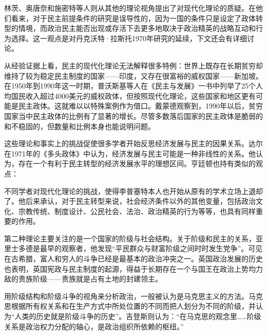 林茨、奥唐奈和施密特等人则从其他的理论视角提出了对现代化理论的质疑。在他们看来，对于民主前提条件的研究是误导性的，因为一国的条件只是设定了政体转型的情境，而政治民主能否出现或存活下去更多地取决于政治精英的战略互动和行为选择。这一观点是对丹克沃特·拉斯托1970年研究的延续，下文还会有详细讨论。

从经验证据上看，民主的现代化理论无法解释很多特例：世界上既存在长期贫穷却维持了较为稳定民主制度的国家——印度，又存在很富裕的威权国家——新加坡。在1950年到1990年这一时期，普沃斯基等人在《民主与发展》一书中列举了25个人均国民收入超过4000美元的威权政体，但按照现代化理论，这些国家和地区更有可能是民主政体。这就难以以特殊案例作为借口。戴蒙德观察到，1990年以后，贫穷国家当中民主政体的比例有了显著的增长。尽管多数落后国家的民主政体是脆弱的和不稳固的，但数量和比例本身也能说明问题。

这些理论和事实上的挑战促使很多学者开始反思经济发展与民主的因果关系。达尔在1971年的《多头政体》中认为，经济发展与民主可能是一种非线性的关系。他认为，存在一个有利于民主转型的经济发展水平的理想区间。亨廷顿也持有类似的观点：


不同学者对现代化理论的挑战，使得李普塞特本人也开始从原有的学术立场上退却了。他后来承认，对于民主转型来说，社会经济条件以外的其他变量，包括政治文化、宗教传统、制度设计、公民社会、法治、政治精英的行为等等，也具有同样重要的作用。


第二种理论主要关注的是一个国家的阶级与社会结构。关于阶级和民主的关系，亚里士多德是最早的观察者，他发现“平民群众与财富阶级之间时时发生党争”。可见在古希腊，富人和穷人的斗争已经是最基本的政治冲突之一。英国政治发展的历史也表明，英国宪政与民主制度的起源，得益于长期存在一个与国王在政治上势均力敌的贵族阶级——贵族就是占有土地的封建领主。

用阶级结构和阶级斗争的视角来分析政治，一般被认为是马克思主义的方法。马克思根据所有权关系和在生产方式中所处位置的不同而把人划分为不同的阶级，并认为“人类的历史就是阶级斗争的历史”。吉登斯则认为：“在马克思的观念里……阶级关系是政治权力分配的轴心，是政治组织所依赖的枢纽。”

